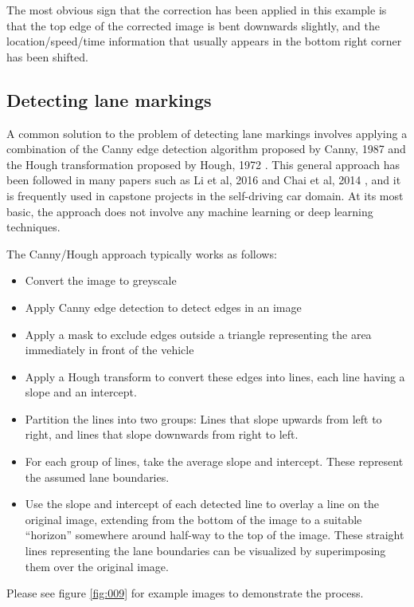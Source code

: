 \documentclass[11pt,twoside]{report}
\begin{document}
The most obvious sign that the correction has been applied in this example is that the top edge of the corrected image is bent downwards slightly, and the location/speed/time information that usually appears in the bottom right corner has been shifted.


\subsection{Detecting lane markings}

A common solution to the problem of detecting lane markings involves applying a combination of the Canny edge detection algorithm proposed by Canny, 1987 \cite{canny} and the Hough transformation proposed by Hough, 1972 \cite{hough}.  This general approach has been followed in many papers such as Li et al, 2016 \cite{canny_example} and Chai et al, 2014 \cite{canny_example2}, and it is frequently used in capstone projects in the self-driving car domain.  At its most basic, the approach does not involve any machine learning or deep learning techniques.

The Canny/Hough approach typically works as follows:

\begin{itemize}
\item{Convert the image to greyscale}
\item{Apply Canny edge detection to detect edges in an image \cite{canny}}
\item{Apply a mask to exclude edges outside a triangle representing the area immediately in front of the vehicle}
\item{Apply a Hough transform \cite{hough} to convert these edges into lines, each line having a slope and an intercept.}
\item{Partition the lines into two groups:  Lines that slope upwards from left to right, and lines that slope downwards from right to left.}
\item{For each group of lines, take the average slope and intercept.  These represent the assumed lane boundaries.}
\item{Use the slope and intercept of each detected line to overlay a line on the original image, extending from the bottom of the image to a suitable ``horizon'' somewhere around half-way to the top of the image.  These straight lines representing the lane boundaries can be visualized by superimposing them over the original image.}
\end{itemize}

Please see figure \ref{fig:009} for example images to demonstrate the process.
\end{document}
